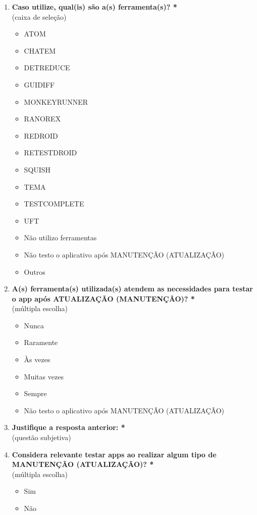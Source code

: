 \begin{enumerate}[label=\bf A\arabic*,leftmargin=1.8cm]
\begin{enumerate}[label= \arabic*]
    \item \textbf{Caso utilize, qual(is) são a(s) ferramenta(s)? *}\\
    (caixa de seleção)
    \begin{itemize}
        \item ATOM
        \item CHATEM
        \item DETREDUCE
        \item GUIDIFF
        \item MONKEYRUNNER
        \item RANOREX
        \item REDROID
        \item RETESTDROID
        \item SQUISH
        \item TEMA
        \item TESTCOMPLETE
        \item UFT
        \item Não utilizo ferramentas
        \item Não testo o aplicativo após MANUTENÇÃO (ATUALIZAÇÃO)
        \item Outros
    \end{itemize}
    
    \item \textbf{A(s) ferramenta(s) utilizada(s) atendem as necessidades para testar o app após ATUALIZAÇÃO (MANUTENÇÃO)? *}\\
    (múltipla escolha)
    
    \begin{itemize}
        \item Nunca
        \item Raramente
        \item Às vezes
        \item Muitas vezes
        \item Sempre
        \item Não testo o aplicativo após MANUTENÇÃO (ATUALIZAÇÃO)
    \end{itemize}
    
    \item \textbf{Justifique a resposta anterior: *}\\
    (questão subjetiva)
    
    \item \textbf{Considera relevante testar apps ao realizar algum tipo de MANUTENÇÃO (ATUALIZAÇÃO)? *}\\
    (múltipla escolha)
    \begin{itemize}
        \item Sim
        \item Não
    \end{itemize}
    

\end{enumerate}
\end{enumerate}
